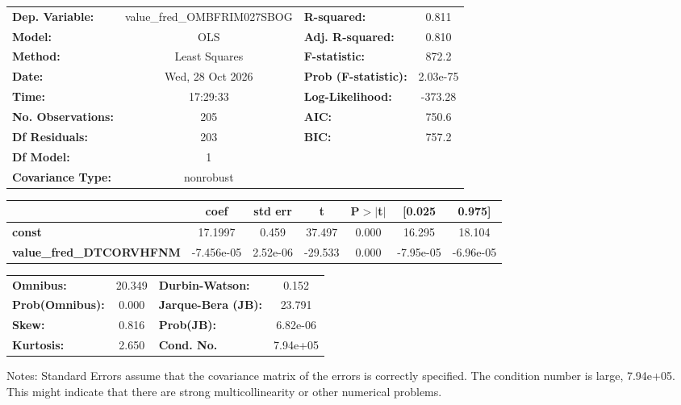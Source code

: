 \begin{center}
\begin{tabular}{lclc}
\toprule
\textbf{Dep. Variable:}          & value\_fred\_OMBFRIM027SBOG & \textbf{  R-squared:         } &     0.811   \\
\textbf{Model:}                  &             OLS             & \textbf{  Adj. R-squared:    } &     0.810   \\
\textbf{Method:}                 &        Least Squares        & \textbf{  F-statistic:       } &     872.2   \\
\textbf{Date:}                   &       Wed, 28 Oct 2026      & \textbf{  Prob (F-statistic):} &  2.03e-75   \\
\textbf{Time:}                   &           17:29:33          & \textbf{  Log-Likelihood:    } &   -373.28   \\
\textbf{No. Observations:}       &               205           & \textbf{  AIC:               } &     750.6   \\
\textbf{Df Residuals:}           &               203           & \textbf{  BIC:               } &     757.2   \\
\textbf{Df Model:}               &                 1           & \textbf{                     } &             \\
\textbf{Covariance Type:}        &          nonrobust          & \textbf{                     } &             \\
\bottomrule
\end{tabular}
\begin{tabular}{lcccccc}
                                 & \textbf{coef} & \textbf{std err} & \textbf{t} & \textbf{P$> |$t$|$} & \textbf{[0.025} & \textbf{0.975]}  \\
\midrule
\textbf{const}                   &      17.1997  &        0.459     &    37.497  &         0.000        &       16.295    &       18.104     \\
\textbf{value\_fred\_DTCORVHFNM} &   -7.456e-05  &     2.52e-06     &   -29.533  &         0.000        &    -7.95e-05    &    -6.96e-05     \\
\bottomrule
\end{tabular}
\begin{tabular}{lclc}
\textbf{Omnibus:}       & 20.349 & \textbf{  Durbin-Watson:     } &    0.152  \\
\textbf{Prob(Omnibus):} &  0.000 & \textbf{  Jarque-Bera (JB):  } &   23.791  \\
\textbf{Skew:}          &  0.816 & \textbf{  Prob(JB):          } & 6.82e-06  \\
\textbf{Kurtosis:}      &  2.650 & \textbf{  Cond. No.          } & 7.94e+05  \\
\bottomrule
\end{tabular}
\end{center}

Notes: \newline
 [1] Standard Errors assume that the covariance matrix of the errors is correctly specified. \newline
 [2] The condition number is large, 7.94e+05. This might indicate that there are \newline
 strong multicollinearity or other numerical problems.